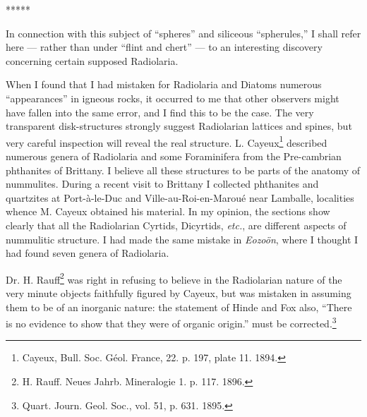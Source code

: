 \documentclass[a4paper, 12pt, oneside, landscape]{article}
\begin{document}
\centerline{*\hspace{15mm}*\hspace{15mm}*\hspace{15mm}*\hspace{15mm}*}
\bigskip

In connection with this subject of ``spheres'' and siliceous ``spherules,'' I shall refer here --- rather than under ``flint and chert'' --- to an interesting discovery concerning certain supposed Radiolaria.

When I found that I had mistaken for Radiolaria and Diatoms numerous ``appearances'' in igneous rocks, it occurred to me that other observers might have fallen into the same error, and I find this to be the case. The very transparent disk-structures strongly suggest Radiolarian lattices and spines, but very careful inspection will reveal the real structure. L. Cayeux\footnote{Cayeux, Bull. Soc. Géol. France, 22. p. 197, plate 11. 1894.} described numerous genera of Radiolaria and some Foraminifera from the Pre-cambrian phthanites of Brittany. I believe all these structures to be parts of the anatomy of nummulites. During a recent visit to Brittany I collected phthanites and quartzites at Port-à-le-Duc and Ville-au-Roi-en-Maroué near Lamballe, localities whence M. Cayeux obtained his material. In my opinion, the sections show clearly that all the Radiolarian Cyrtids, Dicyrtids, \emph{etc.}, are different aspects of nummulitic structure. I had made the same mistake in \emph{Eozoön}, where I thought I had found seven genera of Radiolaria.

Dr. H. Rauff\footnote{H. Rauff. Neues Jahrb. Mineralogie 1. p. 117. 1896.} was right in refusing to believe in the Radiolarian nature of the very minute objects faithfully figured by Cayeux, but was mistaken in assuming them to be of an inorganic nature: the statement of Hinde and Fox also, ``There is no evidence to show that they were of organic origin.'' must be corrected.\footnote{Quart. Journ. Geol. Soc., vol. 51, p. 631. 1895.}
\end{document}

